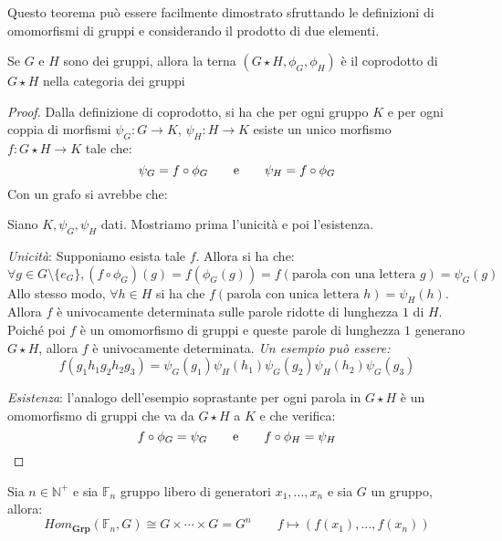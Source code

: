 \documentclass[11pt,a4paper,twoside]{article}
\theoremstyle{definition}
\begin{document}
Questo teorema può essere facilmente dimostrato sfruttando le definizioni di omomorfismi di gruppi e considerando il prodotto di due elementi.

\begin{lemma}{}{}
	Se $G$ e $H$ sono dei gruppi, allora la terna $(G \star H, \phi_G, \phi_H)$ è il coprodotto di $G \star H$ nella categoria dei gruppi
\end{lemma}

\begin{proof}
	Dalla definizione di coprodotto, si ha che per ogni gruppo $K$ e per ogni coppia di morfismi $\psi_G: G \to K$, $\psi_H :H \to K$ esiste un unico morfismo $f: G \star H \to K$ tale che:
	\[ \psi_G= f \circ \phi_G\qquad \text e \qquad \psi_H = f \circ \phi_G \]
	Con un grafo si avrebbe che:
	\begin{center}
	\end{center}
	Siano $K, \psi_G, \psi_H$ dati. Mostriamo prima l'unicità e poi l'esistenza.

	\textit{Unicità}: Supponiamo esista tale $f$. Allora si ha che:
	\[\forall g \in G \setminus\{e_G\}, (f \circ \phi_G)(g) = f(\phi_G(g)) = f(\text{parola con una lettera }g) = \psi_G(g)\]
	Allo stesso modo, $\forall h \in H$ si ha che $f(\text{parola con unica lettera }h) = \psi_H(h)$.\\
	Allora $f$ è univocamente determinata sulle parole ridotte di lunghezza $1$ di $H$.\\
	Poiché poi $f$ è un omomorfismo di gruppi e queste parole di lunghezza $1$ generano $G \star H$, allora $f$ è univocamente determinata.
	\textit{Un esempio può essere:}
	\[ f(g_1h_1g_2h_2g_3) = \psi_G(g_1)\psi_H(h_1)\psi_G(g_2)\psi_H(h_2)\psi_G(g_3) \]

	\textit{Esistenza}: l'analogo dell'esempio soprastante per ogni parola in $G \star H$ è un omomorfismo di gruppi che va da $G \star H$ a $K$ e che verifica:
	\[ f \circ \phi_G = \psi_G\qquad \text e \qquad f \circ \phi_H = \psi_H \]
\end{proof}

\begin{prop}{}{}
	Sia $n \in \mathbb N^+$ e sia $\mathbb F_n$ gruppo libero di generatori $x_1,...,x_n$ e sia $G$ un gruppo, allora:
	\[Hom_{\bm{Grp}}(\mathbb F_n, G) \cong G \times \cdots \times G = G^n\qquad f \mapsto (f(x_1),...,f(x_n))\]
\end{prop}
\end{document}
